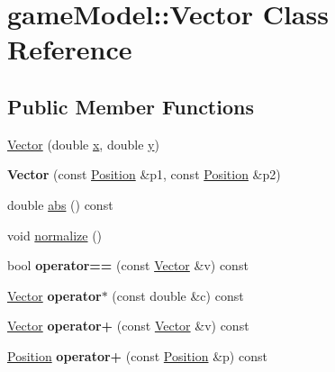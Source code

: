 \hypertarget{classgame_model_1_1_vector}{\section{game\-Model\-:\-:Vector Class Reference}
\label{classgame_model_1_1_vector}
}
\subsection*{Public Member Functions}
\begin{DoxyCompactItemize}
\item 
\hyperlink{classgame_model_1_1_vector_abfcad404f21198136afc5c8e8b820639}{Vector} (double \hyperlink{classgame_model_1_1_vector_a739e0039692645e340238e9154be214a}{x}, double \hyperlink{classgame_model_1_1_vector_a34f020c4e0e747a90002bb53d643a55c}{y})
\item 
\hypertarget{classgame_model_1_1_vector_a00a388626afcfefb1ab1bb22706863b0}{{\bfseries Vector} (const \hyperlink{structgame_model_1_1_position}{Position} \&p1, const \hyperlink{structgame_model_1_1_position}{Position} \&p2)}\label{classgame_model_1_1_vector_a00a388626afcfefb1ab1bb22706863b0}

\item 
double \hyperlink{classgame_model_1_1_vector_a3d4c4a7cce251f2522271891b23551ab}{abs} () const 
\item 
void \hyperlink{classgame_model_1_1_vector_ade91c1e7810dad34c4cbda5d87ad275f}{normalize} ()
\item 
\hypertarget{classgame_model_1_1_vector_a015dc4960d65f384dab4f11c2b3418f7}{bool {\bfseries operator==} (const \hyperlink{classgame_model_1_1_vector}{Vector} \&v) const }\label{classgame_model_1_1_vector_a015dc4960d65f384dab4f11c2b3418f7}

\item 
\hypertarget{classgame_model_1_1_vector_a365b826d3195eb95b9b2b81cbb13d26a}{\hyperlink{classgame_model_1_1_vector}{Vector} {\bfseries operator$\ast$} (const double \&c) const }\label{classgame_model_1_1_vector_a365b826d3195eb95b9b2b81cbb13d26a}

\item 
\hypertarget{classgame_model_1_1_vector_ac3a756df6a0cfe4811e1c2935507d910}{\hyperlink{classgame_model_1_1_vector}{Vector} {\bfseries operator+} (const \hyperlink{classgame_model_1_1_vector}{Vector} \&v) const }\label{classgame_model_1_1_vector_ac3a756df6a0cfe4811e1c2935507d910}

\item 
\hypertarget{classgame_model_1_1_vector_ad15455e6cf880d7f00586a66337d1b8b}{\hyperlink{structgame_model_1_1_position}{Position} {\bfseries operator+} (const \hyperlink{structgame_model_1_1_position}{Position} \&p) const }\label{classgame_model_1_1_vector_ad15455e6cf880d7f00586a66337d1b8b}

\end{DoxyCompactItemize}
